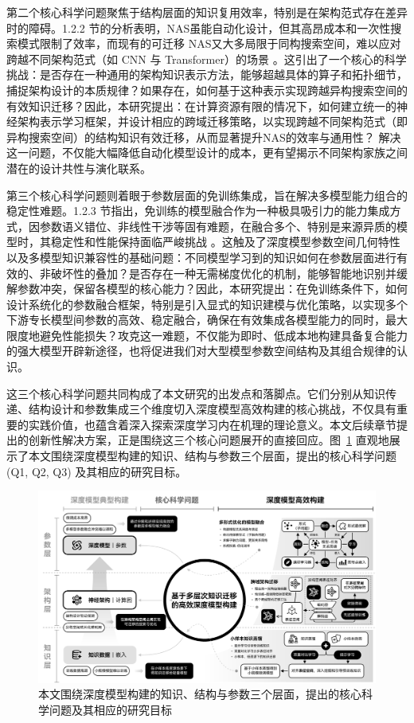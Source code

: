 \documentclass[../main.tex]{subfiles}
\begin{document}
第二个核心科学问题聚焦于结构层面的知识复用效率，特别是在架构范式存在差异时的障碍。1.2.2 节的分析表明，NAS虽能自动化设计，但其高昂成本和一次性搜索模式限制了效率，而现有的可迁移 NAS又大多局限于同构搜索空间，难以应对跨越不同架构范式（如 CNN 与 Transformer）的场景 。这引出了一个核心的科学挑战：是否存在一种通用的架构知识表示方法，能够超越具体的算子和拓扑细节，捕捉架构设计的本质规律？如果存在，如何基于这种表示实现跨越异构搜索空间的有效知识迁移？因此，本研究提出：在计算资源有限的情况下，如何建立统一的神经架构表示学习框架，并设计相应的跨域迁移策略，以实现跨越不同架构范式（即异构搜索空间）的结构知识有效迁移，从而显著提升NAS的效率与通用性？ 解决这一问题，不仅能大幅降低自动化模型设计的成本，更有望揭示不同架构家族之间潜在的设计共性与演化联系。

第三个核心科学问题则着眼于参数层面的免训练集成，旨在解决多模型能力组合的稳定性难题。1.2.3 节指出，免训练的模型融合作为一种极具吸引力的能力集成方式，因参数语义错位、非线性干涉等固有难题，在融合多个、特别是来源异质的模型时，其稳定性和性能保持面临严峻挑战 。这触及了深度模型参数空间几何特性以及多模型知识兼容性的基础问题：不同模型学习到的知识如何在参数层面进行有效的、非破坏性的叠加？是否存在一种无需梯度优化的机制，能够智能地识别并缓解参数冲突，保留各模型的核心能力？因此，本研究提出：在免训练条件下，如何设计系统化的参数融合框架，特别是引入显式的知识建模与优化策略，以实现多个下游专长模型间参数的高效、稳定融合，确保在有效集成各模型能力的同时，最大限度地避免性能损失？攻克这一难题，不仅能为即时、低成本地构建具备复合能力的强大模型开辟新途径，也将促进我们对大型模型参数空间结构及其组合规律的认识。

这三个核心科学问题共同构成了本文研究的出发点和落脚点。它们分别从知识传递、结构设计和参数集成三个维度切入深度模型高效构建的核心挑战，不仅具有重要的实践价值，也蕴含着深入探索深度学习内在机理的理论意义。本文后续章节提出的创新性解决方案，正是围绕这三个核心问题展开的直接回应。图~\ref{fig:research_questions} 直观地展示了本文围绕深度模型构建的知识、结构与参数三个层面，提出的核心科学问题 (Q1, Q2, Q3) 及其相应的研究目标。

\begin{figure}
	\centering
	\includegraphics[width=\linewidth]{research_question.pdf}
	\caption{本文围绕深度模型构建的知识、结构与参数三个层面，提出的核心科学问题及其相应的研究目标}\label{fig:research_questions}
\end{figure}
\end{document}
